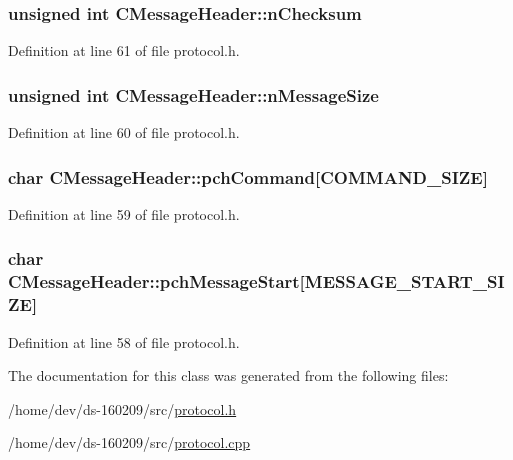\subsubsection[{n\+Checksum}]{\setlength{\rightskip}{0pt plus 5cm}unsigned int C\+Message\+Header\+::n\+Checksum}\label{class_c_message_header_ab9c6bec3694e2c110b4f358af9e55984}


Definition at line 61 of file protocol.\+h.

\hypertarget{class_c_message_header_a67ccb9f1f23af69e309a8d6c8bfff751}{}
\subsubsection[{n\+Message\+Size}]{\setlength{\rightskip}{0pt plus 5cm}unsigned int C\+Message\+Header\+::n\+Message\+Size}\label{class_c_message_header_a67ccb9f1f23af69e309a8d6c8bfff751}


Definition at line 60 of file protocol.\+h.

\hypertarget{class_c_message_header_a87d62b0d9afb3889f318991700a34431}{}
\subsubsection[{pch\+Command}]{\setlength{\rightskip}{0pt plus 5cm}char C\+Message\+Header\+::pch\+Command\mbox{[}{\bf C\+O\+M\+M\+A\+N\+D\+\_\+\+S\+I\+Z\+E}\mbox{]}}\label{class_c_message_header_a87d62b0d9afb3889f318991700a34431}


Definition at line 59 of file protocol.\+h.

\hypertarget{class_c_message_header_a4284bf1d2fd792af89e1c93b7e6e274e}{}
\subsubsection[{pch\+Message\+Start}]{\setlength{\rightskip}{0pt plus 5cm}char C\+Message\+Header\+::pch\+Message\+Start\mbox{[}{\bf M\+E\+S\+S\+A\+G\+E\+\_\+\+S\+T\+A\+R\+T\+\_\+\+S\+I\+Z\+E}\mbox{]}}\label{class_c_message_header_a4284bf1d2fd792af89e1c93b7e6e274e}


Definition at line 58 of file protocol.\+h.



The documentation for this class was generated from the following files\+:\begin{DoxyCompactItemize}
\item 
/home/dev/ds-\/160209/src/\hyperlink{protocol_8h}{protocol.\+h}\item 
/home/dev/ds-\/160209/src/\hyperlink{protocol_8cpp}{protocol.\+cpp}\end{DoxyCompactItemize}
